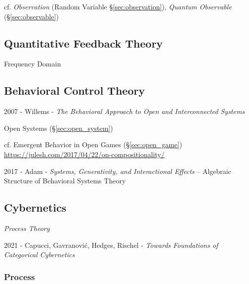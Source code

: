 cf. \emph{Observation} (Random Variable \S\ref{sec:observation}),
\emph{Quantum Observable} (\S\ref{sec:observable})



\subsection{Quantitative Feedback Theory}\label{sec:quantitative_feedback}

Frequency Domain



\subsection{Behavioral Control Theory}\label{sec:behavioral_control}

2007 - Willems - \emph{The Behavioral Approach to Open and Interconnected
  Systems}

\fist Open Systems (\S\ref{sec:open_system})

\fist cf. Emergent Behavior in Open Games (\S\ref{sec:open_game})
\url{https://julesh.com/2017/04/22/on-compositionality/}

2017 - Adam - \emph{Systems, Generativity, and Interactional Effects}
-- Algebraic Structure of Behavioral Systems Theory



\subsection{Cybernetics}\label{sec:cybernetics}

\emph{Process Theory}

2021 - Capucci, Gavranovi\'c, Hedges, Rischel -
\emph{Towards Foundations of Categorical Cybernetics}



\subsubsection{Process}\label{sec:process_cybernetics}

